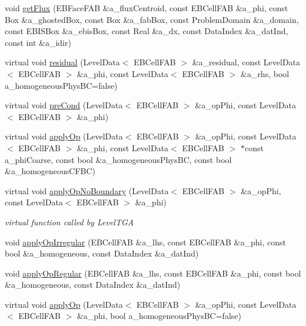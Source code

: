 \begin{DoxyCompactItemize}
\item 
void \hyperlink{classnwoebconductivityop_ab0a79e8059888078bdbd968fb5ef3829}{get\+Flux} (E\+B\+Face\+F\+AB \&a\+\_\+flux\+Centroid, const E\+B\+Cell\+F\+AB \&a\+\_\+phi, const Box \&a\+\_\+ghosted\+Box, const Box \&a\+\_\+fab\+Box, const Problem\+Domain \&a\+\_\+domain, const E\+B\+I\+S\+Box \&a\+\_\+ebis\+Box, const Real \&a\+\_\+dx, const Data\+Index \&a\+\_\+dat\+Ind, const int \&a\+\_\+idir)
\item 
virtual void \hyperlink{classnwoebconductivityop_accfb1abce3dc0a677d1238dd7eb7ac77}{residual} (Level\+Data$<$ E\+B\+Cell\+F\+AB $>$ \&a\+\_\+residual, const Level\+Data$<$ E\+B\+Cell\+F\+AB $>$ \&a\+\_\+phi, const Level\+Data$<$ E\+B\+Cell\+F\+AB $>$ \&a\+\_\+rhs, bool a\+\_\+homogeneous\+Phys\+BC=false)
\item 
virtual void \hyperlink{classnwoebconductivityop_a40138b57712568d37279b342e5deef3e}{pre\+Cond} (Level\+Data$<$ E\+B\+Cell\+F\+AB $>$ \&a\+\_\+op\+Phi, const Level\+Data$<$ E\+B\+Cell\+F\+AB $>$ \&a\+\_\+phi)
\item 
virtual void \hyperlink{classnwoebconductivityop_a8178e482fd6d5f577c5ae9a10cc804c3}{apply\+Op} (Level\+Data$<$ E\+B\+Cell\+F\+AB $>$ \&a\+\_\+op\+Phi, const Level\+Data$<$ E\+B\+Cell\+F\+AB $>$ \&a\+\_\+phi, const Level\+Data$<$ E\+B\+Cell\+F\+AB $>$ $\ast$const a\+\_\+phi\+Coarse, const bool \&a\+\_\+homogeneous\+Phys\+BC, const bool \&a\+\_\+homogeneous\+C\+F\+BC)
\item 
virtual void \hyperlink{classnwoebconductivityop_ad1e8bb630f0b4387ae6077ba0719639b}{apply\+Op\+No\+Boundary} (Level\+Data$<$ E\+B\+Cell\+F\+AB $>$ \&a\+\_\+op\+Phi, const Level\+Data$<$ E\+B\+Cell\+F\+AB $>$ \&a\+\_\+phi)
\begin{DoxyCompactList}\small\item\em virtual function called by Level\+T\+GA \end{DoxyCompactList}\item 
void \hyperlink{classnwoebconductivityop_add2250aef77da70d5979e4a648689444}{apply\+Op\+Irregular} (E\+B\+Cell\+F\+AB \&a\+\_\+lhs, const E\+B\+Cell\+F\+AB \&a\+\_\+phi, const bool \&a\+\_\+homogeneous, const Data\+Index \&a\+\_\+dat\+Ind)
\item 
void \hyperlink{classnwoebconductivityop_a5606c2b614cfd5d727a8cd32367f2b84}{apply\+Op\+Regular} (E\+B\+Cell\+F\+AB \&a\+\_\+lhs, const E\+B\+Cell\+F\+AB \&a\+\_\+phi, const bool \&a\+\_\+homogeneous, const Data\+Index \&a\+\_\+dat\+Ind)
\item 
virtual void \hyperlink{classnwoebconductivityop_a01508cb6b7714d578053c35fd5d20ff3}{apply\+Op} (Level\+Data$<$ E\+B\+Cell\+F\+AB $>$ \&a\+\_\+op\+Phi, const Level\+Data$<$ E\+B\+Cell\+F\+AB $>$ \&a\+\_\+phi, bool a\+\_\+homogeneous\+Phys\+BC=false)

\end{DoxyCompactItemize}
